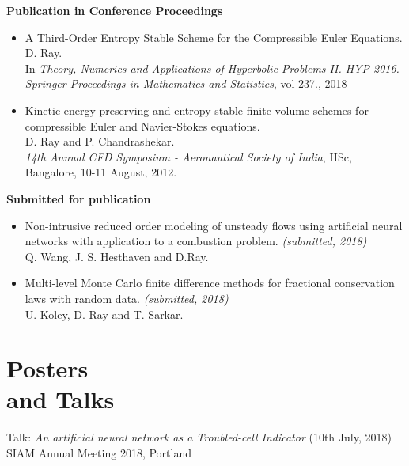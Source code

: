 \documentclass[margin]{res}
\begin{document}
\begin{resume}
\textbf{Publication in Conference Proceedings}                
            \begin{itemize}           
              \item A Third-Order Entropy Stable Scheme for the Compressible Euler Equations.\\
              D. Ray.\\
              In {\it Theory, Numerics and Applications of Hyperbolic Problems II. HYP 2016. Springer Proceedings in Mathematics and Statistics}, vol 237., 2018

              \item Kinetic energy preserving and entropy stable finite volume schemes for compressible Euler and Navier-Stokes equations.\\
              D. Ray and P. Chandrashekar.\\
              {\it 14th Annual CFD Symposium - Aeronautical Society of India}, IISc, Bangalore, 10-11 August, 2012.
             \end{itemize}

\textbf{Submitted for publication}                
            \begin{itemize}           
               
              \item ﻿Non-intrusive reduced order modeling of unsteady flows using artificial neural networks with application to a combustion problem. {\it (submitted, 2018)}\\
              Q. Wang, J. S. Hesthaven and D.Ray.
           
              \item Multi-level Monte Carlo finite difference methods for fractional conservation laws with random data. {\it (submitted, 2018)}\\
              U. Koley, D. Ray and T. Sarkar.

             \end{itemize}

             
\section{Posters \\ and Talks}

              Talk: {\it An artificial neural network as a Troubled-cell Indicator} (10th July, 2018)\\
              SIAM Annual Meeting 2018, Portland
              

\end{resume}
\end{document}
